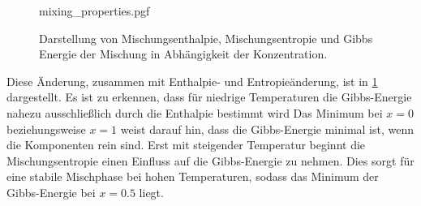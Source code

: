 \begin{figure}
    \centering
    {mixing_properties.pgf}
    \caption{Darstellung von Mischungsenthalpie, Mischungsentropie und Gibbs Energie der Mischung in Abhängigkeit der
    Konzentration.
    }
    \label{fig:mixing_properties}
\end{figure}

Diese Änderung, zusammen mit Enthalpie- und Entropieänderung, ist in \cref{fig:mixing_properties} dargestellt.
Es ist zu erkennen, dass für niedrige Temperaturen die Gibbs-Energie nahezu ausschließlich durch die Enthalpie bestimmt
wird
Das Minimum bei $x=0$ beziehungsweise $x=1$ weist darauf hin, dass die Gibbs-Energie minimal ist, wenn die
Komponenten rein sind.
Erst mit steigender Temperatur beginnt die Mischungsentropie einen Einfluss auf die Gibbs-Energie zu nehmen.
Dies sorgt für eine stabile Mischphase bei hohen Temperaturen, sodass das Minimum der Gibbs-Energie bei $x=0.5$ liegt.